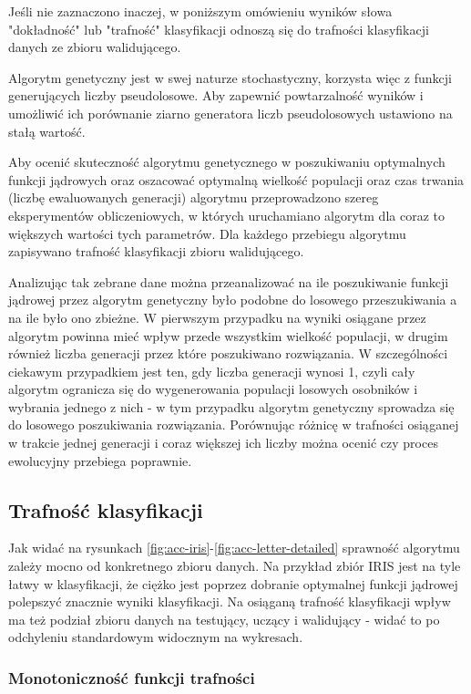 \documentclass{article}
\begin{document}
	Jeśli nie zaznaczono inaczej, w poniższym omówieniu wyników słowa "dokładność" lub "trafność" klasyfikacji odnoszą się do trafności klasyfikacji danych ze zbioru walidującego.
	
	Algorytm genetyczny jest w swej naturze stochastyczny, korzysta więc z funkcji generujących liczby pseudolosowe. Aby zapewnić powtarzalność wyników i umożliwić ich porównanie ziarno generatora liczb pseudolosowych ustawiono na stałą wartość.

	Aby ocenić skuteczność algorytmu genetycznego w poszukiwaniu optymalnych funkcji jądrowych oraz oszacować optymalną wielkość populacji oraz czas trwania (liczbę ewaluowanych generacji) algorytmu przeprowadzono szereg eksperymentów obliczeniowych, w których uruchamiano algorytm dla coraz to większych wartości tych parametrów. Dla każdego przebiegu algorytmu zapisywano trafność klasyfikacji zbioru walidującego.

	Analizując tak zebrane dane można przeanalizować na ile poszukiwanie funkcji jądrowej przez algorytm genetyczny było podobne do losowego przeszukiwania a na ile było ono zbieżne. W pierwszym przypadku na wyniki osiągane przez algorytm powinna mieć wpływ przede wszystkim wielkość populacji, w drugim również liczba generacji przez które poszukiwano rozwiązania. W szczególności ciekawym przypadkiem jest ten, gdy liczba generacji wynosi 1, czyli cały algorytm ogranicza się do wygenerowania populacji losowych osobników i wybrania jednego z nich - w tym przypadku algorytm genetyczny sprowadza się do losowego poszukiwania rozwiązania. Porównując różnicę w trafności osiąganej w trakcie jednej generacji i coraz większej ich liczby można ocenić czy proces ewolucyjny przebiega poprawnie. 
	

	\subsection{Trafność klasyfikacji\label{sec:trafnosc}}
	Jak widać na rysunkach \ref{fig:acc-iris}-\ref{fig:acc-letter-detailed} sprawność algorytmu zależy mocno od konkretnego zbioru danych. Na przykład zbiór IRIS jest na tyle łatwy w klasyfikacji, że ciężko jest poprzez dobranie optymalnej funkcji jądrowej polepszyć znacznie wyniki klasyfikacji.
	Na osiąganą trafność klasyfikacji wpływ ma też podział zbioru danych na testujący, uczący i walidujący - widać to po odchyleniu standardowym widocznym na wykresach.
	
	\subsubsection{Monotoniczność funkcji trafności}
	
\end{document}
